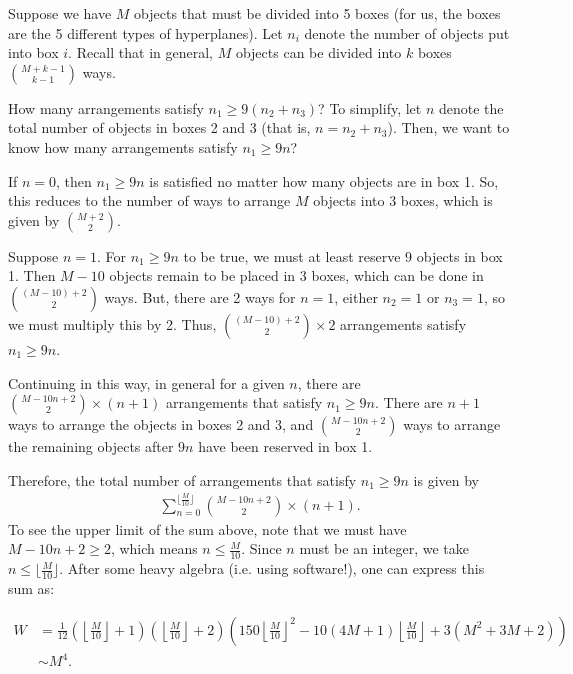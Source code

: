 \documentclass[twoside,11pt]{article}
\begin{document}
Suppose we have $M$ objects that must be divided into 5 boxes (for us, the boxes are the 5 different types of hyperplanes). Let $n_i$ denote the number of objects put into box $i$. Recall that in general, $M$ objects can be divided into $k$ boxes $\binom{M+k-1}{k-1}$ ways.

How many arrangements satisfy $n_1 \geq 9(n_2 + n_3)$? To simplify, let $n$ denote the total number of objects in boxes 2 and 3 (that is, $n = n_2 + n_3$). Then, we want to know how many arrangements satisfy $n_1 \geq 9n$? 

If $n=0$, then $n_1 \geq 9n$ is satisfied no matter how many objects are in box 1. So, this reduces to the number of ways to arrange $M$ objects into 3 boxes, which is given by $\binom{M+2}{2}$.

Suppose $n=1$. For $n_1 \geq 9n$ to be true, we must at least reserve 9 objects in box 1. Then $M-10$ objects remain to be placed in 3 boxes, which can be done in $\binom{(M-10)+2}{2}$ ways. But, there are 2 ways for $n=1$, either $n_2=1$ or $n_3 = 1$, so we must multiply this by 2. Thus, $\binom{(M-10)+2}{2} \times 2$ arrangements satisfy  $n_1 \geq 9n$.

Continuing in this way, in general for a given $n$, there are $\binom{M-10n+2}{2} \times (n+1)$ arrangements that satisfy $n_1 \geq 9n$. There are $n+1$ ways to arrange the objects in boxes 2 and 3, and $\binom{M-10n+2}{2}$ ways to arrange the remaining objects after $9n$ have been reserved in box 1. 

Therefore, the total number of arrangements that satisfy $n_1 \geq 9n$ is given by
\begin{align}
\sum_{n=0}^{\lfloor \frac{M}{10} \rfloor} \binom{M-10n+2}{2} \times (n+1).
\end{align}
To see the upper limit of the sum above, note that we must have $M-10n+2 \geq 2$, which means $n \leq \frac{M}{10}$. Since $n$ must be an integer, we take $n \leq \lfloor \frac{M}{10} \rfloor$. After some heavy algebra (i.e. using software!), one can express this sum as:

\begin{align}%
W &= \frac{1}{12} \left(\left\lfloor \frac{M}{10} \right\rfloor + 1\right) \left(\left\lfloor \frac{M}{10} \right\rfloor + 2\right) \left(150 \left\lfloor \frac{M}{10} \right\rfloor^2 - 10(4M + 1)\left\lfloor \frac{M}{10} \right\rfloor +3(M^2 + 3M + 2)\right) \\
&\sim M^4.
\end{align}
\end{document}
